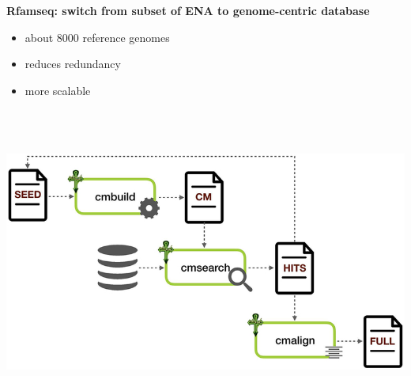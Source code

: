 \documentclass[landscape]{slides}
\begin{document}
\begin{slide}
\begin{center}
  \textbf{Rfamseq: switch from subset of ENA to genome-centric database}
  \begin{itemize}  
  \item about 8000 reference genomes
  \item reduces redundancy
  \item more scalable
  \end{itemize}
\vspace{0.5in}
\includegraphics[height=4in]{figs/kalvari18-rfam-schema}
\end{center}    
\vfill
\tiny {}
\end{slide}
\end{document}
